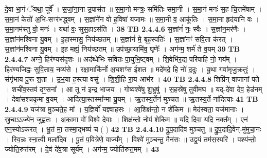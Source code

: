 \documentclass[17pt]{extarticle}
\begin{document}
                  दे॒वा भा॒गं ॅयथा॒ पूर्वे᳚ । स॒जां॒ना॒ना उ॒पास॑त ॥ स॒मा॒नो मन्त्रः॒ समि॑तिः समा॒नी । स॒मा॒नं मनः॑ स॒ह चि॒त्तमे॑षाम् । स॒मा॒नं केतो॑ अ॒भि-सꣳर॑भद्ध्वम् । स॒ज्ञांने॑न वो ह॒विषा॑ यजामः ॥ स॒मा॒नी व॒ आकू॑तिः । स॒मा॒ना हृद॑यानि वः । स॒मा॒नम॑स्तु वो॒ मनः॑ । यथा॑ वः॒ सुस॒हाऽस॑ति । \textbf{ 38} \newline
                  \newline
                                \textbf{ TB 2.4.4.6} \newline
                  स॒ज्ञांनं॑ नः॒ स्वैः । स॒ज्ञांन॒मर॑णैः । स॒ज्ञांन॑मश्विना यु॒वम् । इ॒हास्मासु॒ निय॑च्छतम् ॥ स॒ज्ञांनं॑ मे॒ बृह॒स्पतिः॑ । स॒ज्ञांनꣳ॑ सवि॒ता क॑रत् । स॒ज्ञांन॑मश्विना यु॒वम् । इ॒ह मह्यं॒ निय॑च्छतम् ॥ उप॑च्छा॒यामि॑व॒ घृणेः᳚ । अग॑न्म॒ शर्म॑ ते व॒यम् \textbf{ 39} \newline
                  \newline
                                \textbf{ TB 2.4.4.7} \newline
                  अग्ने॒ हिर॑ण्यसंदृशः ॥ अद॑ब्धेभिः सवितः पा॒युभि॒ष्ट्वम् । शि॒वेभि॑र॒द्य परि॑पाहि नो॒ गय᳚म् । हिर॑ण्यजिह्वः सुवि॒ताय॒ नव्य॑से । रक्षा॒माकि॑र्नो अ॒घशꣳ॑स ईशत ॥ मदे॑मदे॒ हि नो॑ द॒दुः । यू॒था गवा॑मृजु॒क्रतुः॑ । संगृ॑भाय पु॒रू श॒ता । उ॒भ॒या ह॒स्त्या वसु॑ । शि॒शी॒हि रा॒य आभ॑र । \textbf{ 40} \newline
                  \newline
                                \textbf{ TB 2.4.4.8} \newline
                  शिप्रि॑न् वाजानां पते । शची॑व॒स्तव॑ दꣳ॒॒सना᳚ । आ तू न॑ इन्द्र भाजय । गोष्वश्वे॑षु शु॒भ्रुषु॑ । स॒हस्रे॑षु तुवीमघ ॥ यद्-दे॑वा देव॒ हेड॑नम् । देवा॑सश्चकृ॒मा व॒यम् । आदि॑त्या॒स्तस्मा᳚न्मा यू॒यम् । ऋ॒तस्य॒र्तेन॑ मुञ्चत ॥ ऋ॒तस्य॒र्ते-ना॑दित्याः \textbf{ 41} \newline
                  \newline
                                \textbf{ TB 2.4.4.9} \newline
                  यज॑त्रा मु॒ञ्चते॒ह मा᳚ । य॒ज्ञिर्वो॑ यज्ञ्वाहसः । आ॒शिक्ष॑न्तो॒ न शे॑किम ॥ मेद॑स्वता॒ यज॑मानाः । स्रु॒चाऽऽज्ये॑न॒ जुह्व॑तः । अ॒का॒मा वो॑ विश्वे देवाः । शिक्ष॑न्तो॒ नोप॑ शेकिम ॥ यदि॒ दिवा॒ यदि॒ नक्त᳚म् । एन॑ एन॒स्योऽक॑रत् । भू॒तं मा॒ तस्मा॒द्भव्यं॑ च ( ) \textbf{ 42} \newline
                  \newline
                                \textbf{ TB 2.4.4.10} \newline
                  द्रु॒प॒दादि॑व मुञ्चतु ॥ द्रु॒प॒दादि॒वेन्-मु॑मुचा॒नः । स्वि॒न्नः स्ना॒त्वी मला॑दिव । पू॒तं प॒वित्रे॑णे॒ वाज्य᳚म् । विश्वे॑ मुञ्चन्तु॒ मैन॑सः ॥ उद्व॒यं तम॑स॒स्परि॑ । पश्य॑न्तो॒ ज्योति॒रुत्त॑रम् । दे॒वं दे॑व॒त्रा सूर्य᳚म् । अग॑न्म॒ ज्योति॑रुत्त॒मम् । \textbf{ 43} \newline
\end{document}
